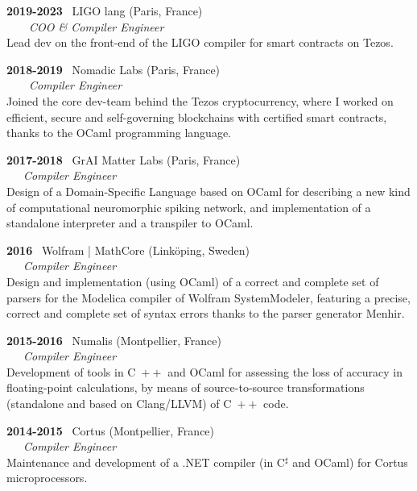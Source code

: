 \documentclass[a4paper,11pt]{article}
\newcommand{\cpp}{\mbox{C \hspace*{-2.5mm} \raise 0.7mm \hbox{${\scriptscriptstyle ++}$}}}
\begin{document}
\bigskip

\noindent\textbf{2019-2023} \ \textsf{LIGO lang} (Paris,
France)\\ \ \ \ \ \emph{COO \& Compiler Engineer}\\ Lead dev on the
front-end of the LIGO compiler for smart contracts on Tezos.

\bigskip

\noindent\textbf{2018-2019} \ \textsf{Nomadic Labs} (Paris,
  France)\\ \ \ \ \ \emph{Compiler Engineer}\\ Joined the core
  dev-team behind the Tezos cryptocurrency, where I worked on
  efficient, secure and self-governing blockchains with certified
  smart contracts, thanks to the OCaml programming language.

\bigskip

\noindent\textbf{2017-2018} \ \textsf{GrAI Matter Labs} (Paris,
France)\\ \ \ \ \emph{Compiler Engineer}\\ Design of a Domain-Specific
Language based on OCaml for describing a new kind of computational
neuromorphic spiking network, and implementation of a standalone
interpreter and a transpiler to OCaml.

\newpage

\noindent\textbf{2016} \ \textsf{Wolfram | MathCore}
(Link\"oping, Sweden)\\ \ \ \ \emph{Compiler Engineer}\\ Design and
implementation (using OCaml) of a correct and complete set of parsers
for the Modelica compiler of Wolfram SystemModeler, featuring a
precise, correct and complete set of syntax errors thanks to the
parser generator Menhir.

\bigskip

\noindent\textbf{2015-2016} \ \textsf{Numalis} (Montpellier,
France)\\ \ \ \ \emph{Compiler Engineer}\\ Development of tools in
\cpp{} and OCaml for assessing the loss of accuracy in floating-point
calculations, by means of source-to-source transformations (standalone
and based on Clang/LLVM) of \cpp{} code.

\bigskip

\noindent\textbf{2014-2015} \ \textsf{Cortus} (Montpellier,
France)\\ \ \ \ \emph{Compiler Engineer}\\ Maintenance and development
of a .NET compiler (in C$^\sharp$ and OCaml) for \textsf{Cortus}
microprocessors.
\end{document}
